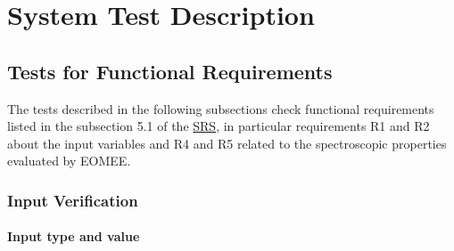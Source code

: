 \documentclass[12pt, titlepage]{article}
\begin{document}
\section{System Test Description}
\label{section:systemtests}
	
\subsection{Tests for Functional Requirements}

%
The tests described in the following subsections check functional requirements 
listed in the subsection 5.1 of the 
\href{https://github.com/gabrielasd/eomee/tree/cas741/docs/SRS} {SRS}, in 
particular requirements R1 and R2 about the input variables and R4 and R5 
related to the spectroscopic properties evaluated by EOMEE.

\subsubsection{Input Verification}
\label{section:inputs}

		
\paragraph{Input type and value}
\end{document}
